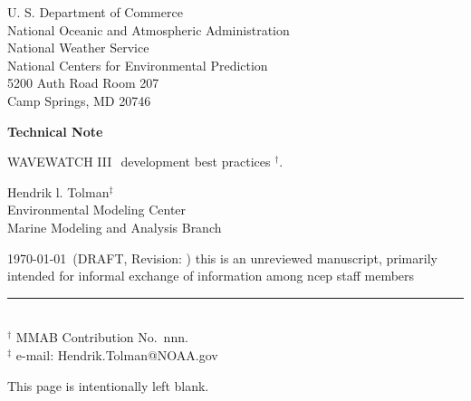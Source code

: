 \documentclass[12pt]{article}
\newcommand{\pstyle}{myheadings}
\newcommand{\ww}{WAVEWATCH III$\:$\texttrademark}
\newcommand{\bpage}{\vfill \pagebreak \strut

\vspace{2.5in} \centerline{This page is intentionally left blank.}}
\begin{document}

\pagestyle{empty}

\strut \vspace{5mm}

\begin{center} 
U. S. Department of Commerce \\
National Oceanic and Atmospheric Administration \\
National Weather Service \\
National Centers for Environmental Prediction \\
5200 Auth Road Room 207 \\
Camp Springs, MD 20746

\vspace{15mm}

{\bf Technical Note}

\vspace{15mm}

{\large \ww\ development best practices $^\dag$.}

\vspace{20mm}

Hendrik l. Tolman$^\ddag$%
\\
Environmental Modeling Center \\
Marine Modeling and Analysis Branch

\vspace{25mm}

\today\ (DRAFT, Revision: \SVNRevision)
\vfill {\sc this is an unreviewed manuscript, primarily
intended for informal exchange of information among ncep staff
members}

\end{center}
\noindent \rule{140mm}{0.5mm} \\
{\small $^\dag$ MMAB Contribution No.~nnn. \\
$^\ddag$ e-mail: Hendrik.Tolman@NOAA.gov} \\ %

\bpage

\pagebreak

\pagestyle{\pstyle}
\setcounter{page}{1}
\end{document}
